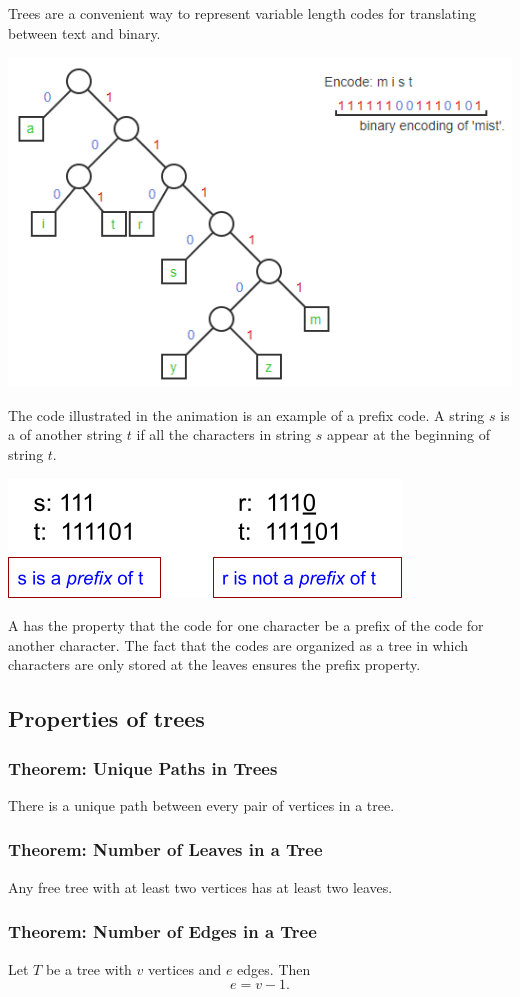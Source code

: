 Trees are a convenient way to represent variable length codes for translating between text and binary.
\begin{center}
  \includegraphics[width=0.6\linewidth]{resources/variable length encoding example.png}
\end{center}
The code illustrated in the animation is an example of a prefix code. A string $s$ is a  of another string $t$ if all the characters in string $s$ appear at the beginning of string $t$.
\begin{center}
  \includegraphics[width=0.4\linewidth]{resources/string prefix example.png}
\end{center}
A  has the property that the code for one character  be a prefix of the code for another character. The fact that the codes are organized as a tree in which characters are only stored at the leaves ensures the prefix property.

\subsection{Properties of trees}

\subsubsection*{Theorem: Unique Paths in Trees}
There is a unique path between every pair of vertices in a tree.

\subsubsection*{Theorem: Number of Leaves in a Tree}
Any free tree with at least two vertices has at least two leaves.

\subsubsection*{Theorem: Number of Edges in a Tree}
Let $T$ be a tree with $v$ vertices and $e$ edges. Then
\[
  e = v-1.
\]

